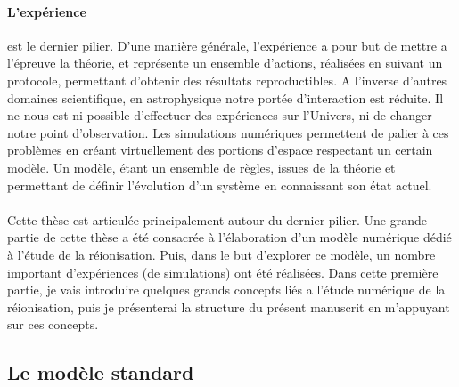 \paragraph{L'expérience} est le dernier pilier.
D'une manière générale, l'expérience a pour but de mettre a l’épreuve la théorie, et représente un ensemble d'actions, réalisées en suivant un protocole, permettant d'obtenir des résultats reproductibles.
A l'inverse d'autres domaines scientifique, en astrophysique notre portée d'interaction est réduite.
Il ne nous est ni possible d'effectuer des expériences sur l'Univers, ni de changer notre point d'observation.
Les simulations numériques permettent de palier à ces problèmes en créant virtuellement des portions d'espace respectant un certain modèle.
Un modèle, étant un ensemble de règles, issues de la théorie et permettant de définir l'évolution d'un système en connaissant son état actuel.


\paragraph{}

Cette thèse est articulée principalement autour du dernier pilier.
Une grande partie de cette thèse a été consacrée à l'élaboration d'un modèle numérique dédié à l'étude de la réionisation.
Puis, dans le but d'explorer ce modèle, un nombre important d'expériences (de simulations) ont été réalisées.
Dans cette première partie, je vais introduire quelques grands concepts liés a l'étude numérique de la réionisation, puis je présenterai la structure du présent manuscrit en m'appuyant sur ces concepts.

\subsection*{Le modèle standard}

